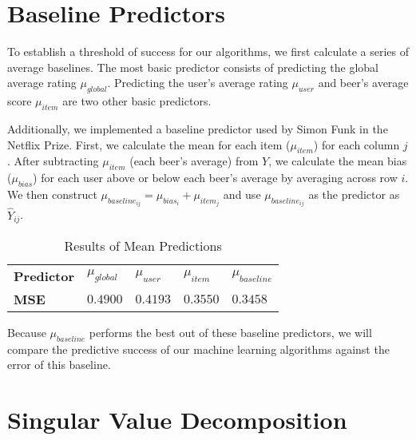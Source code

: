 \documentclass[12pt]{article}
\begin{document}
\section{Baseline Predictors}
To establish a threshold of success for our algorithms, we first calculate a series of average baselines. The most basic predictor consists of predicting the global average rating $\mu_{global}$. Predicting the user's average rating $\mu_{user}$ and beer's average score $\mu_{item}$ are two other basic predictors.

Additionally, we implemented a baseline predictor used by Simon Funk in the Netflix Prize.\textsuperscript{\cite{Funk}} First, we calculate the mean for each item ($\mu_{item}$) for each column $j$. After subtracting $\mu_{item}$ (each beer's average) from $Y$, we calculate the mean bias ($\mu_{bias}$) for each user above or below each beer's average by averaging across row $i$. We then construct ${\mu}_{baseline_{ij}} = \mu_{bias_i} + \mu_{item_j}$ and use $\mu_{baseline_{ij}}$ as the predictor as $\hat{Y}_{ij}$.


\begin{table}[ht!]
\centering
\caption{Results of Mean Predictions}
\vspace{2mm}
\begin{tabular}{lllll}
\hline
\textbf{Predictor}         & $\mu_{global}$ & $\mu_{user}$ & $\mu_{item}$ & $\mu_{baseline}$ \\
\textbf{MSE}              & $0.4900$       & $0.4193$     & $0.3550$     & $0.3458$         \\ \hline
\end{tabular}
\end{table}

Because ${\mu}_{baseline}$ performs the best out of these baseline predictors, we will compare the predictive success of our machine learning algorithms against the error of this baseline.

\section{Singular Value Decomposition}
\end{document}
